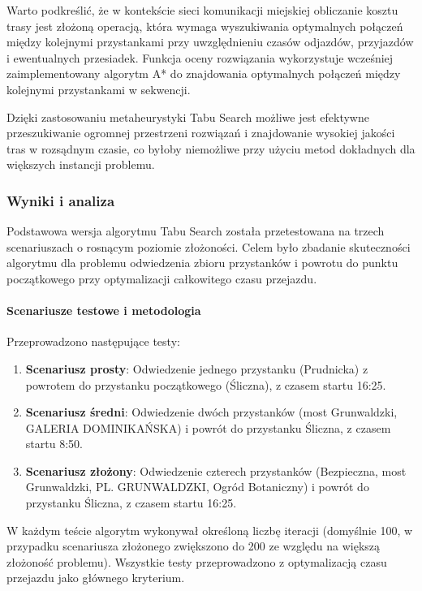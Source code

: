 \documentclass[12pt,a4paper]{article}
\begin{document}
Warto podkreślić, że w kontekście sieci komunikacji miejskiej obliczanie kosztu trasy jest złożoną operacją, która wymaga wyszukiwania optymalnych połączeń między kolejnymi przystankami przy uwzględnieniu czasów odjazdów, przyjazdów i ewentualnych przesiadek. Funkcja oceny rozwiązania wykorzystuje wcześniej zaimplementowany algorytm A* do znajdowania optymalnych połączeń między kolejnymi przystankami w sekwencji.

Dzięki zastosowaniu metaheurystyki Tabu Search możliwe jest efektywne przeszukiwanie ogromnej przestrzeni rozwiązań i znajdowanie wysokiej jakości tras w rozsądnym czasie, co byłoby niemożliwe przy użyciu metod dokładnych dla większych instancji problemu.

\subsubsection{Wyniki i analiza}
Podstawowa wersja algorytmu Tabu Search została przetestowana na trzech scenariuszach o rosnącym poziomie złożoności. Celem było zbadanie skuteczności algorytmu dla problemu odwiedzenia zbioru przystanków i powrotu do punktu początkowego przy optymalizacji całkowitego czasu przejazdu.

\paragraph{Scenariusze testowe i metodologia}
Przeprowadzono następujące testy:
\begin{enumerate}
    \item \textbf{Scenariusz prosty}: Odwiedzenie jednego przystanku (Prudnicka) z powrotem do przystanku początkowego (Śliczna), z czasem startu 16:25.
    \item \textbf{Scenariusz średni}: Odwiedzenie dwóch przystanków (most Grunwaldzki, GALERIA DOMINIKAŃSKA) i powrót do przystanku Śliczna, z czasem startu 8:50.
    \item \textbf{Scenariusz złożony}: Odwiedzenie czterech przystanków (Bezpieczna, most Grunwaldzki, PL. GRUNWALDZKI, Ogród Botaniczny) i powrót do przystanku Śliczna, z czasem startu 16:25.
\end{enumerate}

W każdym teście algorytm wykonywał określoną liczbę iteracji (domyślnie 100, w przypadku scenariusza złożonego zwiększono do 200 ze względu na większą złożoność problemu). Wszystkie testy przeprowadzono z optymalizacją czasu przejazdu jako głównego kryterium.
\end{document}
